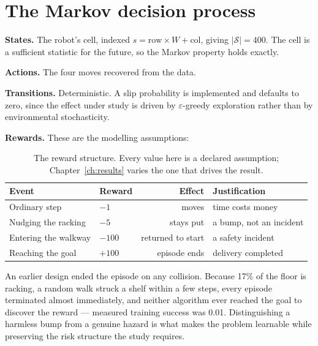 \section{The Markov decision process}
\label{sec:rewards}

\textbf{States.} The robot's cell, indexed $s = \text{row} \times W + \text{col}$, giving
$|\mathcal{S}| = 400$. The cell is a sufficient statistic for the future, so the Markov property
holds exactly.

\textbf{Actions.} The four moves recovered from the data.

\textbf{Transitions.} Deterministic. A slip probability is implemented and defaults to zero, since
the effect under study is driven by $\varepsilon$-greedy exploration rather than by environmental
stochasticity.

\textbf{Rewards.} These are the modelling assumptions:

\begin{table}[ht]
\centering
\caption[The reward structure]{The reward structure. Every value here is a declared assumption;
Chapter~\ref{ch:results} varies the one that drives the result.}
\label{tab:rewards}
\begin{tabular}{llr l}
\toprule
\textbf{Event} & \textbf{Reward} & \textbf{Effect} & \textbf{Justification} \\
\midrule
Ordinary step        & $-1$   & moves          & time costs money \\
Nudging the racking  & $-5$   & stays put      & a bump, not an incident \\
Entering the walkway & $-100$ & returned to start & a safety incident \\
Reaching the goal    & $+100$ & episode ends   & delivery completed \\
\bottomrule
\end{tabular}
\end{table}

 An
earlier design ended the episode on any collision. Because 17\% of the floor is racking, a random
walk struck a shelf within a few steps, every episode terminated almost immediately, and neither
algorithm ever reached the goal to discover the reward --- measured training success was 0.01.
Distinguishing a harmless bump from a genuine hazard is what makes the problem learnable while
preserving the risk structure the study requires.
